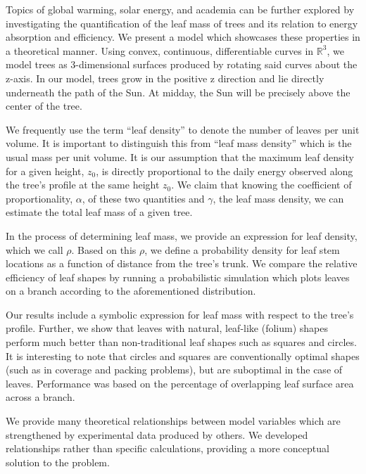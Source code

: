 \documentclass[12pt]{article}
\begin{document}
Topics of global warming, solar energy, and academia can be further
explored by investigating the quantification of the leaf mass of trees
and its relation to energy absorption and efficiency. We present a
model which showcases these properties in a theoretical manner.  Using
convex, continuous, differentiable curves in $\mathbb{R}^3$, we model
trees as 3-dimensional surfaces produced by rotating said curves about
the z-axis. In our model, trees grow in the positive z direction and
lie directly underneath the path of the Sun. At midday, the Sun will
be precisely above the center of the tree.

We frequently use the term ``leaf density'' to denote the number of
leaves per unit volume. It is important to distinguish this from
``leaf mass density'' which is the usual mass per unit volume. It is
our assumption that the maximum leaf density for a given height,
$z_0$, is directly proportional to the daily energy observed along the
tree's profile at the same height $z_0$. We claim that knowing the
coefficient of proportionality, $\alpha$, of these two quantities and
$\gamma$, the leaf mass density, we can estimate the total leaf mass
of a given tree.

In the process of determining leaf mass, we provide an expression for
leaf density, which we call $\rho$. Based on this $\rho$, we define a
probability density for leaf stem locations as a function of distance
from the tree's trunk. We compare the relative efficiency of leaf
shapes by running a probabilistic simulation which plots leaves on a
branch according to the aforementioned distribution.

Our results include a symbolic expression for leaf mass with respect
to the tree's profile. Further, we show that leaves with natural,
leaf-like (folium) shapes perform much better than non-traditional
leaf shapes such as squares and circles. It is interesting to note
that circles and squares are conventionally optimal shapes (such as in
coverage and packing problems), but are suboptimal in the case of
leaves. Performance was based on the percentage of overlapping leaf
surface area across a branch.

We provide many theoretical relationships between model variables
which are strengthened by experimental data produced by others. We
developed relationships rather than specific calculations, providing a
more conceptual solution to the problem.
\end{document}
